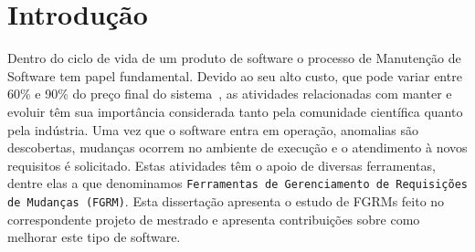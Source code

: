 \chapter{Introdução}
\label{ch:intro}




Dentro do ciclo de vida de um produto de software o processo de Manutenção de
Software tem papel fundamental. Devido ao seu alto custo, que pode variar entre
60\% e 90\% do preço final do sistema~\cite{kaur2015review}, as atividades
relacionadas com manter e evoluir têm sua importância considerada tanto pela
comunidade científica quanto pela indústria. Uma vez que o software entra em
operação, anomalias são descobertas, mudanças ocorrem no ambiente de execução e
o atendimento à novos requisitos é solicitado. Estas atividades têm o apoio de
diversas ferramentas, dentre elas a que denominamos \texttt{Ferramentas de
    Gerenciamento de Requisições de Mudanças (FGRM)}. Esta dissertação apresenta
o estudo de FGRMs feito no correspondente projeto de mestrado e apresenta
contribuições sobre como melhorar este tipo de software.

